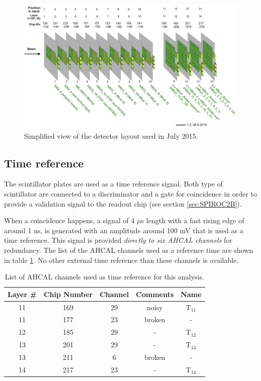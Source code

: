 \begin{figure}[htbp!]
	\centering
	\includegraphics[width=0.7\linewidth]{chap5/fig_EnergyCalib/Detector_layout_copy.png}
	\caption{Simplified view of the detector layout used in July 2015.} \label{fig:Det_layout}
\end{figure}

\subsection{Time reference}
\label{subsec:trigger}

The scintillator plates are used as a time reference signal. Both type of scintillator are connected to a discriminator and a gate for coincidence in order to provide a validation signal to the readout chip (see section \ref{sec:SPIROC2B}).

When a coincidence happens, a signal of 4 $\mu$s length with a fast rising edge of around 1 ns, is generated with an amplitude around 100 mV that is used as a time reference. This signal is provided \textit{directly to six AHCAL channels} for redundancy. The list of the AHCAL channels used as a reference time are shown in table \ref{table:trigger_signal_list}. No other external time reference than these channels is available.

\begin{table}[htb!]
	\centering
	\caption{List of AHCAL channels used as time reference for this analysis.}
	\label{table:trigger_signal_list}
	\begin{tabular}{@{} ccccc @{}}
		\toprule
		Layer \# & Chip Number & Channel & Comments & Name \\
		\midrule
		11 & 169 & 29 & noisy & T$_{11}$ \\
		11 & 177 & 23 & broken & - \\
		12 & 185 & 29 & - & T$_{12}$ \\
		13 & 201 & 29 & -  & T$_{13}$ \\
		13 & 211 & 6 & broken & - \\
		14 & 217 & 23 & - & T$_{14}$ \\
		\bottomrule
	\end{tabular}
\end{table}

